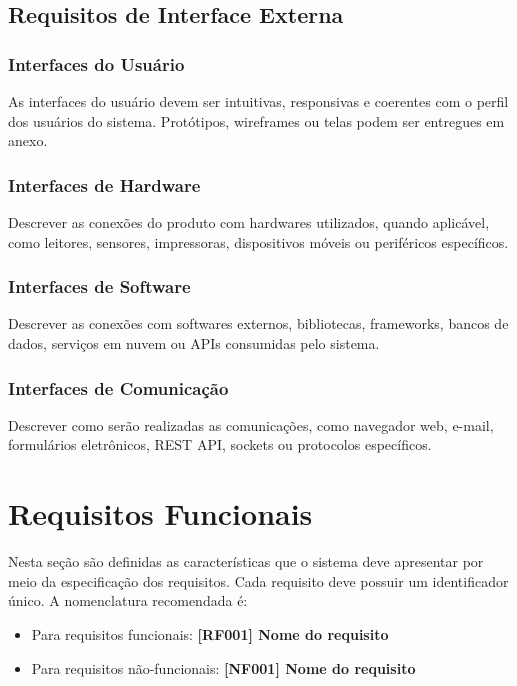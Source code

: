 \documentclass[12pt,a4paper]{article}
\begin{document}
\subsection{Requisitos de Interface Externa}

\subsubsection{Interfaces do Usuário}
As interfaces do usuário devem ser intuitivas, responsivas e coerentes com o perfil dos usuários do sistema. Protótipos, wireframes ou telas podem ser entregues em anexo.

\subsubsection{Interfaces de Hardware}
Descrever as conexões do produto com hardwares utilizados, quando aplicável, como leitores, sensores, impressoras, dispositivos móveis ou periféricos específicos.

\subsubsection{Interfaces de Software}
Descrever as conexões com softwares externos, bibliotecas, frameworks, bancos de dados, serviços em nuvem ou APIs consumidas pelo sistema.

\subsubsection{Interfaces de Comunicação}
Descrever como serão realizadas as comunicações, como navegador web, e-mail, formulários eletrônicos, REST API, sockets ou protocolos específicos.

\section{Requisitos Funcionais}

Nesta seção são definidas as características que o sistema deve apresentar por meio da especificação dos requisitos. Cada requisito deve possuir um identificador único. A nomenclatura recomendada é:

\begin{itemize}[leftmargin=1.2cm]
    \item Para requisitos funcionais: \textbf{[RF001] Nome do requisito}
    \item Para requisitos não-funcionais: \textbf{[NF001] Nome do requisito}
\end{itemize}
\end{document}
